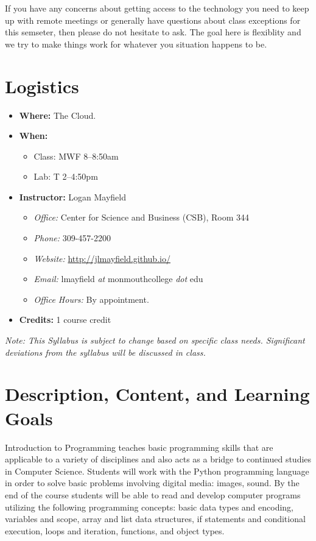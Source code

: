 \documentclass[10pt]{article}
\begin{document}
If you have any concerns about getting access to the technology you need to keep up with
remote meetings or generally have questions about class exceptions for this semseter,
then please do not hesitate to ask. The goal here is flexiblity and we try to make
things work for whatever you situation happens to be.

\newpage

\section{Logistics}
\begin{itemize}
\item \textbf{Where: } The Cloud.
\item \textbf{When: }
\begin{itemize}
  \item Class: MWF 8--8:50am
  \item Lab: T 2--4:50pm
\end{itemize}
\item \textbf{Instructor: } Logan Mayfield
\begin{itemize}
\item \textit{Office: } Center for Science and Business (CSB), Room 344\footnotemark[2]
\item \textit{Phone: } 309-457-2200 %
\item \textit{Website: } \url{http://jlmayfield.github.io/}
\item \textit{Email: } lmayfield \textit{at} monmouthcollege \textit{dot} edu
\item \textit{Office Hours: }  By appointment.
\end{itemize}
\item \textbf{Credits: } 1 course credit
\end{itemize}
\emph{Note: This Syllabus is subject to change based on specific class needs. Significant deviations from the syllabus will be discussed in class.}


\section{Description, Content, and Learning Goals}

Introduction to Programming teaches basic programming skills that are applicable to a variety of disciplines and also acts as a bridge to continued studies in Computer Science. Students will work with the Python programming language in order to solve basic problems involving digital media: images, sound.  By the end of the course students will be able to read and develop computer programs utilizing the following programming concepts: basic data types and encoding, variables and scope, array and list data structures, if statements and conditional execution, loops and iteration, functions, and object types.
\end{document}

